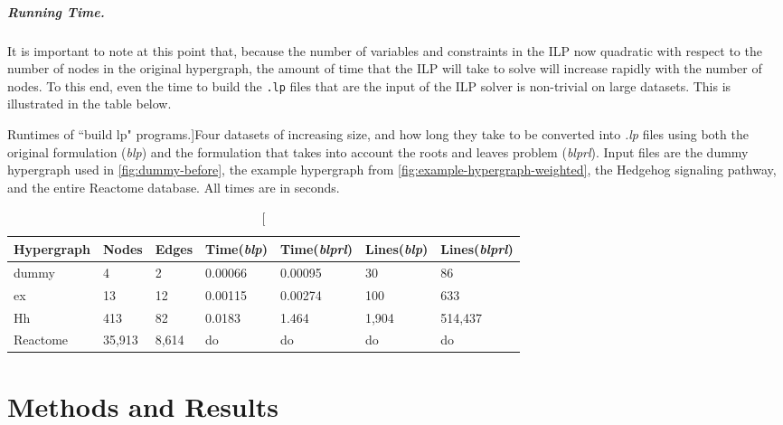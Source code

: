 \documentclass[12pt,twoside]{reedthesis}
\theoremstyle{definition}
\begin{document}
\paragraph{Running Time.}It is important to note at this point that, because the number of variables and constraints in the ILP now quadratic with respect to the number of nodes in the original hypergraph, the amount of time that the ILP will take to solve will increase rapidly with the number of nodes. To this end, even the time to build the \texttt{.lp} files that are the input of the ILP solver is non-trivial on large datasets. This is illustrated in the table below.

\begin{table}[!h]
\begin{center}
  \label{tab:build_lp_runtimes}
  \caption[Runtimes of ``build lp" programs.]{Four datasets of increasing size, and how long they take to be converted into \textit{.lp} files using both the original formulation (\textit{blp}) and the formulation that takes into account the roots and leaves problem (\textit{blprl}). Input files are the dummy hypergraph used in \ref{fig:dummy-before}, the example hypergraph from \ref{fig:example-hypergraph-weighted}, the Hedgehog signaling pathway, and the entire Reactome database. All times are in seconds.}
\begin{tabular}{ |l||l|l|l|l|l|l| }%
  \hline%
  Hypergraph & Nodes & Edges & Time(\textit{blp}) & Time(\textit{blprl}) & Lines(\textit{blp}) & Lines(\textit{blprl}) \\%
  \hline \hline
  dummy & 4 & 2 & 0.00066 & 0.00095 & 30 & 86 \\ \hline%
  ex & 13 & 12 & 0.00115 & 0.00274 & 100 & 633 \\ \hline%
  Hh & 413 & 82 & 0.0183 & 1.464 & 1,904 & 514,437  \\ \hline%
  Reactome & 35,913 & 8,614 & do & do & do & do \\ \hline%
\end{tabular}%
\end{center}
\end{table}


\chapter{Methods and Results}
\end{document}
